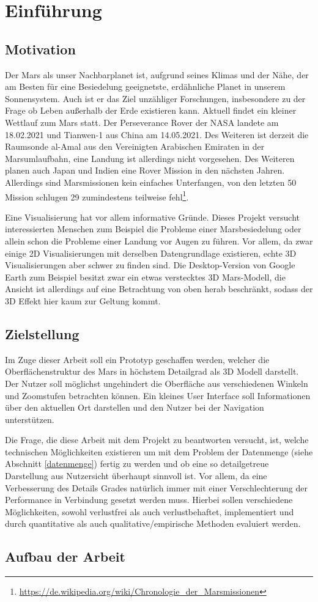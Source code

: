 \chapter{Einführung}

\section{Motivation}
Der Mars als unser Nachbarplanet ist, aufgrund seines Klimas und der Nähe, der am Besten für eine Besiedelung geeignetste, erdähnliche Planet in unserem Sonnensystem. Auch ist er das Ziel unzähliger Forschungen, insbesondere zu der Frage ob Leben außerhalb der Erde existieren kann. Aktuell findet ein kleiner Wettlauf zum Mars statt. Der Perseverance Rover der NASA landete am 18.02.2021 und Tianwen-1 aus China am 14.05.2021. Des Weiteren ist derzeit die Raumsonde al-Amal aus den Vereinigten Arabischen Emiraten in der Marsumlaufbahn, eine Landung ist allerdings nicht vorgesehen. Des Weiteren planen auch Japan und Indien eine Rover Mission in den nächsten Jahren. Allerdings sind Marsmissionen kein einfaches Unterfangen, von den letzten 50 Mission schlugen 29 zumindestens teilweise fehl\footnote{\url{https://de.wikipedia.org/wiki/Chronologie_der_Marsmissionen}}.

Eine Visualisierung hat vor allem informative Gründe. Dieses Projekt versucht interessierten Menschen zum Beispiel die Probleme einer Marsbesiedelung oder allein schon die
Probleme einer Landung vor Augen zu führen. Vor allem, da zwar einige 2D Visualisierungen mit derselben Datengrundlage existieren, echte 3D Visualisierungen aber schwer zu finden sind. Die Desktop-Version von Google Earth zum Beispiel besitzt zwar ein etwas verstecktes 3D Mars-Modell, die Ansicht ist allerdings auf eine Betrachtung von oben herab beschränkt, sodass der 3D Effekt hier kaum zur Geltung kommt.

\section{Zielstellung}
Im Zuge dieser Arbeit soll ein Prototyp geschaffen werden, welcher die Oberflächenstruktur des Mars in höchstem Detailgrad als 3D Modell darstellt. Der Nutzer soll möglichst ungehindert die Oberfläche aus verschiedenen Winkeln und Zoomstufen betrachten können. Ein kleines User Interface soll Informationen über den aktuellen Ort darstellen und den Nutzer bei der Navigation unterstützen.

Die Frage, die diese Arbeit mit dem Projekt zu beantworten versucht, ist, welche technischen Möglichkeiten existieren um mit dem Problem der Datenmenge (siehe Abschnitt \ref{datenmenge}) fertig zu werden und ob eine so detailgetreue Darstellung aus Nutzersicht überhaupt sinnvoll ist. Vor allem, da eine Verbesserung des Details Grades natürlich immer mit einer Verschlechterung der Performance in Verbindung gesetzt werden muss. Hierbei sollen verschiedene Möglichkeiten, sowohl verlustfrei als auch verlustbehaftet, implementiert und durch quantitative als auch qualitative/empirische Methoden evaluiert werden.

\section{Aufbau der Arbeit}

